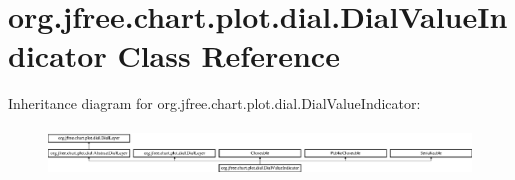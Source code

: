 \hypertarget{classorg_1_1jfree_1_1chart_1_1plot_1_1dial_1_1_dial_value_indicator}{}\section{org.\+jfree.\+chart.\+plot.\+dial.\+Dial\+Value\+Indicator Class Reference}
\label{classorg_1_1jfree_1_1chart_1_1plot_1_1dial_1_1_dial_value_indicator}
Inheritance diagram for org.\+jfree.\+chart.\+plot.\+dial.\+Dial\+Value\+Indicator\+:\begin{figure}[H]
\begin{center}
\leavevmode
\includegraphics[height=1.302326cm]{classorg_1_1jfree_1_1chart_1_1plot_1_1dial_1_1_dial_value_indicator}
\end{center}
\end{figure}
